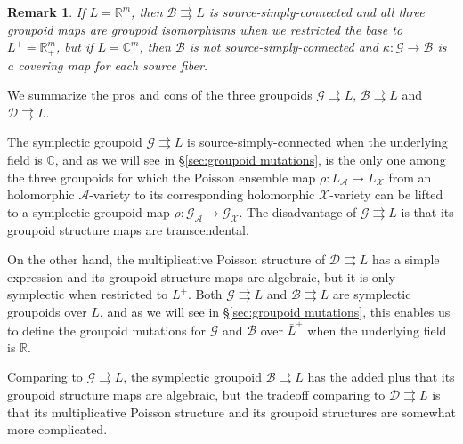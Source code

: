 \documentclass{amsart}
\newtheorem{remark}[theorem]{Remark}
\numberwithin{equation}{section}
\newcommand{\cA}{\mathcal{A}}
\newcommand{\cB}{\mathcal{B}}
\newcommand{\cD}{\mathcal{D}}
\newcommand{\cG}{\mathcal{G}}
\newcommand{\cX}{\mathcal{X}}
\newcommand{\CC}{\mathbb{C}}
\newcommand{\RR}{\mathbb{R}}
\newcommand{\rra}{\rightrightarrows}
\begin{document}
\begin{remark}
  If $L = \RR^m$, then $\cB \rra L$ is source-simply-connected and all three groupoid maps are groupoid isomorphisms when we restricted the base to $L^+ = \RR_+^m$, but if $L = \CC^m$, then $\cB$ is not source-simply-connected and $\kappa: \cG \to \cB$ is a covering map for each source fiber.
\end{remark}

We summarize the pros and cons of the three groupoids $\cG \rra L$, $\cB \rra L$ and $\cD \rra L$.

The symplectic groupoid $\cG \rra L$ is source-simply-connected when the underlying field is $\CC$, and as we will see in \S\ref{sec:groupoid mutations}, is the only one among the three groupoids for which the Poisson ensemble map $\rho: L_\cA \to L_\cX$ from an holomorphic $\cA$-variety to its corresponding holomorphic $\cX$-variety can be lifted to a symplectic groupoid map $\rho: \cG_\cA \to \cG_\cX$.
The disadvantage of $\cG \rra L$ is that its groupoid structure maps are transcendental.

On the other hand, the multiplicative Poisson structure of $\cD \rra L$ has a simple expression and its groupoid structure maps are algebraic, but it is only symplectic when restricted to $L^+$.
Both $\cG \rra L$ and $\cB \rra L$ are symplectic groupoids over $L$, and as we will see in \S\ref{sec:groupoid mutations}, this enables us to define the groupoid mutations for $\cG$ and $\cB$ over $\bar{L}^+$ when the underlying field is $\RR$.

Comparing to $\cG \rra L$, the symplectic groupoid $\cB \rra L$ has the added plus that its groupoid structure maps are algebraic, but the tradeoff comparing to $\cD \rra L$ is that its multiplicative Poisson structure and its groupoid structures are somewhat more complicated.
\end{document}
